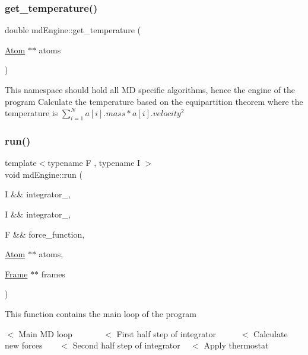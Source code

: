 \subsubsection{\texorpdfstring{get\+\_\+temperature()}{get\_temperature()}}
{\footnotesize\ttfamily double md\+Engine\+::get\+\_\+temperature (\begin{DoxyParamCaption}\item[{\mbox{\hyperlink{class_atom}{Atom}} $\ast$$\ast$}]{atoms }\end{DoxyParamCaption})}

This namespace should hold all MD specific algorithms, hence the \textquotesingle{}engine\textquotesingle{} of the program Calculate the temperature based on the equipartition theorem where the temperature is $\sum^N_{i=1}a[i].mass * a[i].velocity^2$\mbox{\label{group___main_ga9814b46948bb9bf9930a3a9392aa3a94}} 
\subsubsection{\texorpdfstring{run()}{run()}}
{\footnotesize\ttfamily template$<$typename F , typename I $>$ \\
void md\+Engine\+::run (\begin{DoxyParamCaption}\item[{I \&\&}]{integrator\+\_,  }\item[{I \&\&}]{integrator\+\_,  }\item[{F \&\&}]{force\+\_\+function,  }\item[{\mbox{\hyperlink{class_atom}{Atom}} $\ast$$\ast$}]{atoms,  }\item[{\mbox{\hyperlink{class_frame}{Frame}} $\ast$$\ast$}]{frames }\end{DoxyParamCaption})}

This function contains the main loop of the program

$<$ Main MD loop ~\newline
~\newline
~\newline
~\newline
 $<$ First half step of integrator ~\newline
~\newline
~\newline
 $<$ Calculate new forces ~\newline
~\newline
 $<$ Second half step of integrator ~\newline
 $<$ Apply thermostat 